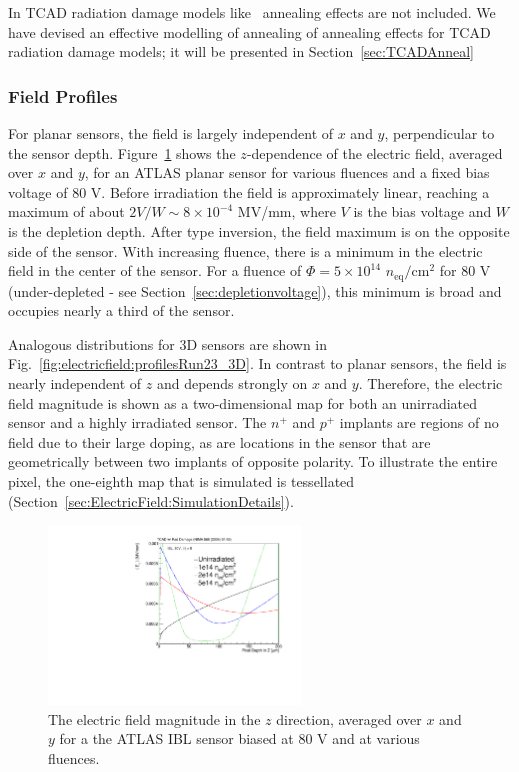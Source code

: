 In TCAD radiation damage models like~\cite{bib:DP,CHIOCHIA2006} annealing effects are not included. 
We have devised an effective modelling of annealing of annealing effects for TCAD radiation 
damage models; it will be presented in Section~\ref{sec:TCADAnneal} 

\subsubsection{Field Profiles}
\label{sec:Efieldprofile}

For planar sensors, the field is largely independent of $x$ and $y$, perpendicular to the sensor depth. Figure~\ref{fig:electricfield:profilesRun23} shows the $z$-dependence of the electric field, averaged over $x$ and $y$, for an ATLAS planar sensor for various fluences and a fixed bias voltage of 80 V.  Before irradiation the field is approximately linear, reaching a maximum of about $2V/W\sim 8\times 10^{-4}$ MV/mm, where $V$ is the bias voltage and $W$ is the depletion depth.  After type inversion, the field maximum is on the opposite side of the sensor.  With increasing fluence, there is a minimum in the electric field in the center of the sensor.  For a fluence of $\Phi=5\times 10^{14}$ $n_\text{eq}/\text{cm}^2$ for 80 V (under-depleted - see Section~\ref{sec:depletionvoltage}), this minimum is broad and occupies nearly a third of the sensor.

Analogous distributions for 3D sensors are shown in Fig.~\ref{fig:electricfield:profilesRun23_3D}.  In contrast to planar sensors, the field is nearly independent of $z$ and depends strongly on $x$ and $y$.  Therefore, the electric field magnitude is shown as a two-dimensional map for both an unirradiated sensor and a highly irradiated sensor.  The $n^+$ and $p^+$ implants are regions of no field due to their large doping, as are locations in the sensor that are geometrically between two implants of opposite polarity.  To illustrate the entire pixel, the one-eighth map that is simulated is tessellated (Section~\ref{sec:ElectricField:SimulationDetails}).

\begin{figure}[!htpb]
\centering
\includegraphics[width=0.6\textwidth]{Ez_0fluence80V.pdf}
\caption{The electric field magnitude in the $z$ direction, averaged over $x$ and $y$ for a the ATLAS IBL sensor biased at 80 V and at various fluences.}
\label{fig:electricfield:profilesRun23}
\end{figure}

